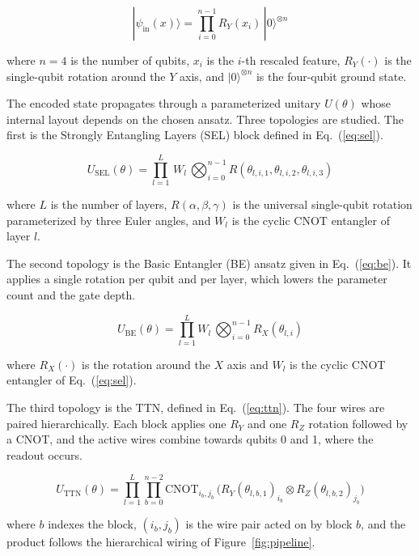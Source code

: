 \documentclass[runningheads]{llncs}
\begin{document}
\begin{equation}
|\psi_{\text{in}}(x)\rangle = \prod_{i=0}^{n-1} R_Y(x_i)\,|0\rangle^{\otimes n}
\label{eq:embed}
\end{equation}

where $n=4$ is the number of qubits, $x_i$ is the $i$-th rescaled feature, $R_Y(\cdot)$ is the single-qubit rotation around the $Y$ axis, and $|0\rangle^{\otimes n}$ is the four-qubit ground state.

The encoded state propagates through a parameterized unitary $U(\theta)$ whose internal layout depends on the chosen ansatz. Three topologies are studied. The first is the Strongly Entangling Layers (SEL) block defined in Eq.~(\ref{eq:sel}).

\begin{equation}
U_{\text{SEL}}(\theta) = \prod_{l=1}^{L}\, W_l\,\bigotimes_{i=0}^{n-1} R(\theta_{l,i,1},\theta_{l,i,2},\theta_{l,i,3})
\label{eq:sel}
\end{equation}

where $L$ is the number of layers, $R(\alpha,\beta,\gamma)$ is the universal single-qubit rotation parameterized by three Euler angles, and $W_l$ is the cyclic CNOT entangler of layer $l$.

The second topology is the Basic Entangler (BE) ansatz given in Eq.~(\ref{eq:be}). It applies a single rotation per qubit and per layer, which lowers the parameter count and the gate depth.

\begin{equation}
U_{\text{BE}}(\theta) = \prod_{l=1}^{L} W_l \,\bigotimes_{i=0}^{n-1} R_X(\theta_{l,i})
\label{eq:be}
\end{equation}

where $R_X(\cdot)$ is the rotation around the $X$ axis and $W_l$ is the cyclic CNOT entangler of Eq.~(\ref{eq:sel}).

The third topology is the TTN, defined in Eq.~(\ref{eq:ttn}). The four wires are paired hierarchically. Each block applies one $R_Y$ and one $R_Z$ rotation followed by a CNOT, and the active wires combine towards qubits 0 and 1, where the readout occurs.

\begin{equation}
U_{\text{TTN}}(\theta) = \prod_{l=1}^{L} \prod_{b=0}^{n-2} \mathrm{CNOT}_{i_b,j_b}\,\bigl(R_Y(\theta_{l,b,1})_{i_b}\otimes R_Z(\theta_{l,b,2})_{j_b}\bigr)
\label{eq:ttn}
\end{equation}

where $b$ indexes the block, $(i_b,j_b)$ is the wire pair acted on by block $b$, and the product follows the hierarchical wiring of Figure~\ref{fig:pipeline}.
\end{document}
